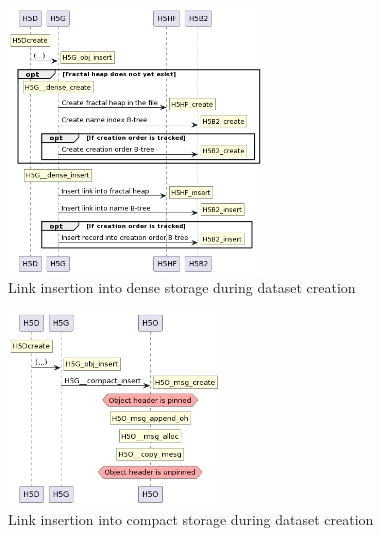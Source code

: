 \begin{figure}
    \centering
    \includegraphics[width=0.6\textwidth]{images/tour_4_uml_link_storage_dense.png}
    \caption{Link insertion into dense storage during dataset creation}
    \label{fig:tour-4-uml-link-storage-dense}
\end{figure}

\begin{figure}
    \centering
    \includegraphics[width=0.5\textwidth]{images/tour_4_uml_link_storage_compact.png}
    \caption{Link insertion into compact storage during dataset creation}
    \label{fig:tour-4-uml-link-storage-compact}
\end{figure}

